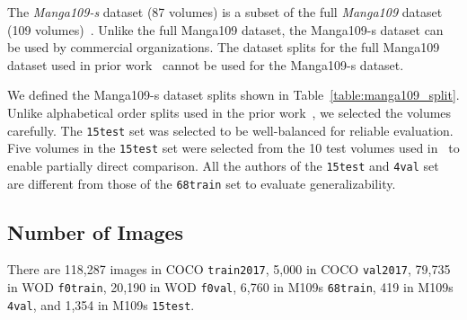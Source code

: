 \documentclass[10pt,twocolumn,letterpaper]{article}
\begin{document}
The \textit{Manga109-s} dataset (87 volumes) is a subset of the full \textit{Manga109} dataset (109 volumes)~\cite{Manga109_Aizawa_IEEEMM2020}.
Unlike the full Manga109 dataset, the Manga109-s dataset can be used by commercial organizations.
The dataset splits for the full Manga109 dataset used in prior work~\cite{Manga109_detection_Ogawa_2018} cannot be used for the Manga109-s dataset.

We defined the Manga109-s dataset splits shown in Table~\ref{table:manga109_split}.
Unlike alphabetical order splits used in the prior work~\cite{Manga109_detection_Ogawa_2018}, we selected the volumes carefully.
The \texttt{15test} set was selected to be well-balanced for reliable evaluation.
Five volumes in the \texttt{15test} set were selected from the 10 test volumes used in~\cite{Manga109_detection_Ogawa_2018} to enable partially direct comparison.
All the authors of the \texttt{15test} and \texttt{4val} set are different from those of the \texttt{68train} set to evaluate generalizability.



\subsection{Number of Images}

There are
118,287 images in COCO \texttt{train2017},
5,000 in COCO \texttt{val2017},
79,735 in WOD \texttt{f0train},
20,190 in WOD \texttt{f0val},
6,760 in M109s \texttt{68train},
419 in M109s \texttt{4val}, and
1,354 in M109s \texttt{15test}.
\end{document}
